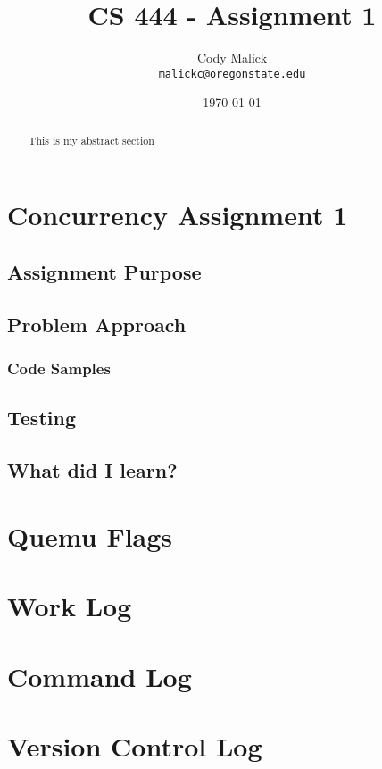 \documentclass[10pt,letterpaper]{article}
\begin{document}
\begin{titlepage}
  \title{CS 444 - Assignment 1}
  \author{Cody Malick\\
  \texttt{malickc@oregonstate.edu}}
  \date{\today}
  \maketitle

  \begin{abstract}
      This is my abstract section
  \end{abstract}

\end{titlepage}

\tableofcontents
\clearpage

\section{Concurrency Assignment 1}
  \subsection{Assignment Purpose}
  \subsection{Problem Approach}
  \subsubsection{Code Samples}
    \cite{johnm.2014}
  \subsection{Testing}
  \subsection{What did I learn?}

\section{Quemu Flags}

\section{Work Log}

\section{Command Log}

\section{Version Control Log}

\clearpage



\end{document}

